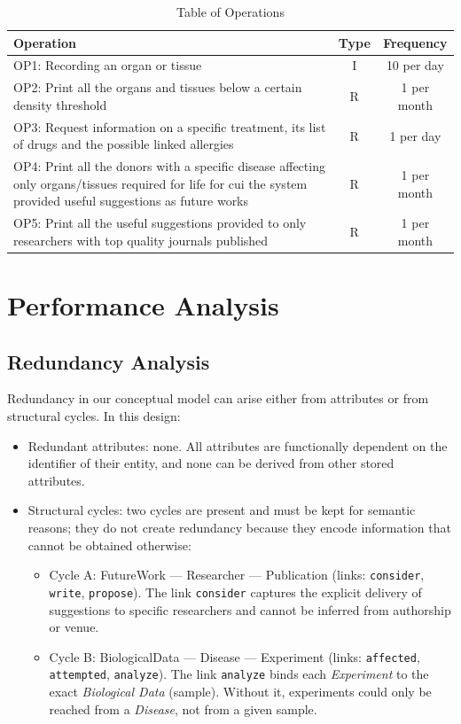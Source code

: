 \documentclass[11pt,a4paper]{article}
\begin{document}
\begin{table}[H]
\centering
\small
\renewcommand{\arraystretch}{1.2}
\begin{tabularx}{\textwidth}{|X|c|c|}
\hline
	\textbf{Operation} & \textbf{Type} & \textbf{Frequency} \\
\hline
OP1: Recording an organ or tissue & I & 10 per day \\
OP2: Print all the organs and tissues below a certain density threshold & R & 1 per month \\
OP3: Request information on a specific treatment, its list of drugs and the possible linked allergies & R & 1 per day \\
OP4: Print all the donors with a specific disease affecting only organs/tissues required for life for cui the system provided useful suggestions as future works & R & 1 per month \\
OP5: Print all the useful suggestions provided to only researchers with top quality journals published & R & 1 per month \\
\hline
\end{tabularx}
\caption{Table of Operations}
\normalsize
\end{table}

\section{Performance Analysis}

\subsection{Redundancy Analysis}
Redundancy in our conceptual model can arise either from attributes or from structural cycles. In this design:
\begin{itemize}
  \item Redundant attributes: none. All attributes are functionally dependent on the identifier of their entity, and none can be derived from other stored attributes.
  \item Structural cycles: two cycles are present and must be kept for semantic reasons; they do not create redundancy because they encode information that cannot be obtained otherwise:
  \begin{itemize}
    \item Cycle A: FutureWork — Researcher — Publication (links: \texttt{consider}, \texttt{write}, \texttt{propose}). The link \texttt{consider} captures the explicit delivery of suggestions to specific researchers and cannot be inferred from authorship or venue.
    \item Cycle B: BiologicalData — Disease — Experiment (links: \texttt{affected}, \texttt{attempted}, \texttt{analyze}). The link \texttt{analyze} binds each \textit{Experiment} to the exact \textit{Biological Data} (sample). Without it, experiments could only be reached from a \textit{Disease}, not from a given sample.
  \end{itemize}
\end{itemize}
\end{document}
